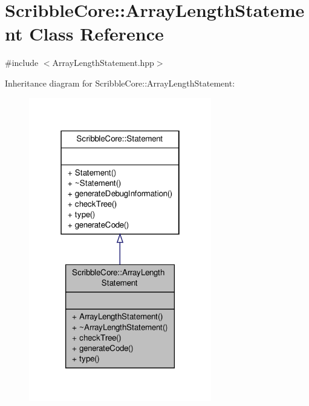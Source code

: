 \hypertarget{class_scribble_core_1_1_array_length_statement}{\section{Scribble\-Core\-:\-:Array\-Length\-Statement Class Reference}
\label{class_scribble_core_1_1_array_length_statement}
}


{\ttfamily \#include $<$Array\-Length\-Statement.\-hpp$>$}



Inheritance diagram for Scribble\-Core\-:\-:Array\-Length\-Statement\-:
\nopagebreak
\begin{figure}[H]
\begin{center}
\leavevmode
\includegraphics[width=226pt]{class_scribble_core_1_1_array_length_statement__inherit__graph}
\end{center}
\end{figure}


